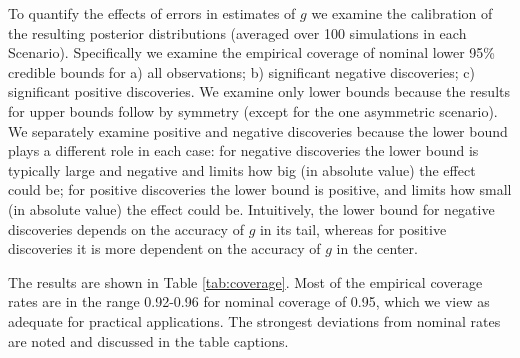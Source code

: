 \documentclass[11pt]{article}
\begin{document}
To quantify the effects of errors in estimates of $g$ we examine the calibration of the resulting posterior distributions (averaged over 100 simulations in each Scenario). 
Specifically we examine the empirical coverage of nominal lower 95\% credible bounds for a) all observations; b) significant negative discoveries; c) significant positive discoveries.  We examine only lower bounds because the results for upper bounds follow by 
symmetry (except for the one asymmetric scenario). We separately examine positive and negative discoveries because the lower bound plays a different role
in each case: for negative discoveries the lower bound is typically large and negative and limits how big (in absolute value) 
the effect could be; for positive discoveries the lower bound 
is positive, and limits how small (in absolute value) the effect could be. Intuitively, the lower bound for negative discoveries depends on the accuracy of $g$ in its tail,
whereas for positive discoveries it is more dependent on the accuracy of $g$ in the center.

The results are shown in Table \ref{tab:coverage}.  Most of the empirical coverage rates are in the range 0.92-0.96 for nominal coverage of 0.95, which we view
as adequate for practical applications. The strongest deviations from nominal rates are noted and discussed in the table captions.




\end{document}

